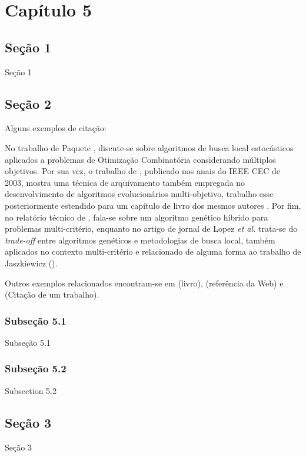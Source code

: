 \chapter{Capítulo 5}

\section{Seção 1}

Seção 1


\section{Seção 2}

Alguns exemplos de citação: 

No trabalho de Paquete \cite{PaquetePhD}, discute-se sobre algoritmos
de busca local estocásticos aplicados a problemas de Otimização Combinatória
considerando múltiplos objetivos. Por sua vez, o trabalho de
\cite{KnowlesBoundedLebesgue}, publicado nos anais do IEEE CEC de 2003, mostra
uma técnica de arquivamento também empregada no desenvolvimento de algoritmos
evolucionários multi-objetivo, trabalho esse posteriormente estendido para um
capítulo de livro dos mesmos autores \cite{KnowlesBoundedPareto}. Por fim, no
relatório técnico de , fala-se sobre um algoritmo
genético híbrido para problemas multi-critério, enquanto no artigo de jornal de
Lopez \textit{et al.} \cite{LopezPaqueteStu} trata-se do \textit{trade-off}
entre algoritmos genéticos e metodologias de busca local, também aplicados no
contexto multi-critério e relacionado de alguma forma ao trabalho de Jaszkiewicz
(\citeyear{Jaszkiewicz}).

Outros exemplos relacionados encontram-se em \cite{Silberschatz} (livro),
\cite{DB2XML} (referência da Web) e \cite{Angelo} (Citação de um trabalho).

\subsection{Subseção 5.1}

Subseção 5.1


\subsection{Subseção 5.2}

Subsection 5.2


\section{Seção 3}

Seção 3